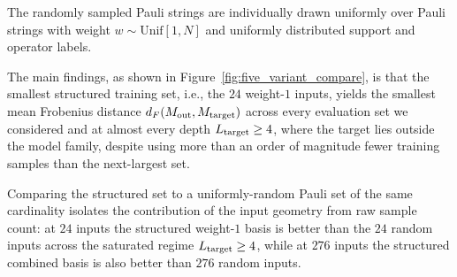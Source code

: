 \documentclass[%
 reprint,
superscriptaddress,
 amsmath,amssymb,
 aps,
]{revtex4-2}
\begin{document}
The randomly sampled Pauli strings are individually drawn uniformly over Pauli strings with weight $w\sim\mathrm{Unif}[1,N]$ and uniformly distributed support and operator labels.

The main findings, as shown in Figure~\ref{fig:five_variant_compare}, is that the smallest structured training set, i.e., the $24$ weight-$1$ inputs, yields the smallest mean Frobenius distance $d_F(M_{\rm out},M_{\rm target})$ across every evaluation set we considered and at almost every depth $L_{\rm target}\geq 4$, where the target lies outside the model family, despite using more than an order of magnitude fewer training samples than the next-largest set.


Comparing the structured set to a uniformly-random Pauli set of the same cardinality isolates the contribution of the input geometry from raw sample count: at $24$ inputs the structured weight-$1$ basis is better than the $24$ random inputs across the saturated regime $L_{\rm target}\geq 4$, while at $276$ inputs the structured combined basis is also better than $276$ random inputs.

\end{document}
